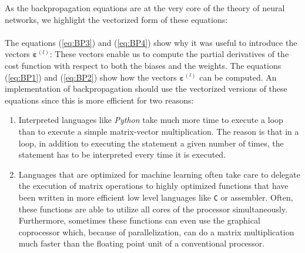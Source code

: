 As the backpropagation equations are at the very core of the theory of neural networks, we highlight the
vectorized form of these equations:
\\[0.2cm]
\hspace*{0.3cm}
\colorbox{red}{}
\\[0.2cm]
The equations (\ref{eq:BP3}) and (\ref{eq:BP4}) show why it was useful to introduce the
vectors $\boldsymbol{\varepsilon}^{(l)}$: These vectors enable us to compute the partial derivatives of the cost function
with respect to both the biases and the weights.  The equations (\ref{eq:BP1}) and (\ref{eq:BP2})
show how the vectors $\boldsymbol{\varepsilon}^{(l)}$ can be computed.  An implementation of backpropagation should use the vectorized
versions of these equations since this is more efficient for two reasons:
\begin{enumerate}
\item Interpreted languages like \textsl{Python} take much more time to
      execute a loop than to execute a simple matrix-vector multiplication.  The reason is that in a loop, in
      addition to executing the statement a given number of times, the statement has to be interpreted 
      every time it is executed.
\item Languages that are optimized for machine learning often take care to delegate the execution of matrix
      operations to highly optimized functions that have been written in more efficient low level languages like
      \texttt{C} or assembler.  Often, these functions are able to utilize all cores of the processor
      simultaneously.  Furthermore, sometimes these functions can even use the graphical coprocessor
      which, because of parallelization, can do a matrix multiplication much faster than the floating point unit of
      a conventional processor.
\end{enumerate}

